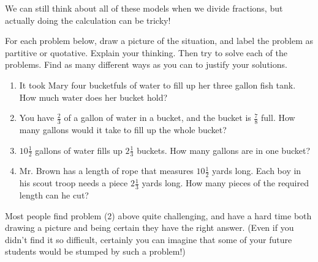 We can still think about all of these models when we divide fractions, but actually doing the calculation can be tricky!

\begin{thinkpair*}\label{partorquot}
For each problem below, draw a picture of the situation, and  label the problem as partitive or quotative.  Explain your thinking.  Then try to solve each of the problems.  Find as many different ways as you can to justify your solutions.


\begin{enumerate}
\item
It took Mary four bucketfuls of water to fill up her three gallon fish tank.  How much water does her bucket hold?\\

\item
You have $\frac 2 3$ of a gallon of water in a bucket, and the bucket is $\frac 7 8$ full.  How many gallons would it take to fill up the whole bucket?\\


\item 
$10\frac 1 2$ gallons of water fills up $2 \frac 1 3$ buckets.  How many gallons are in one bucket?\\

\item
Mr. Brown has a length of rope that measures $10 \frac 1 2$ yards long.  Each boy in his scout troop needs a piece $2 \frac 1 3$ yards long.  How many pieces of the required length can he cut?\\


\end{enumerate}



\end{thinkpair*}




Most people find problem (2) above quite challenging, and have a hard time both drawing a picture and being certain they have the right answer.  (Even if you didn't find it so difficult, certainly you can imagine that some of your future students would be stumped by such a problem!)  

